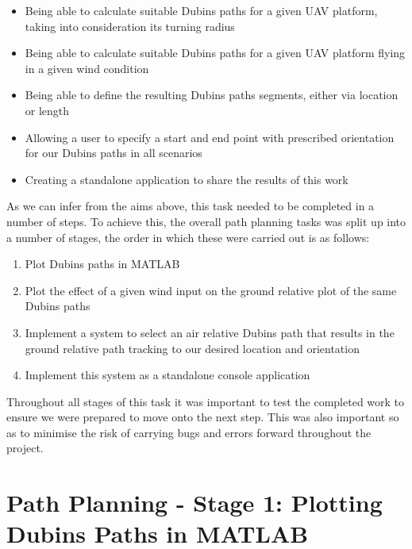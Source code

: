 \begin{itemize}
	\item Being able to calculate suitable Dubins paths for a given UAV platform, taking into consideration its turning radius
	\item Being able to calculate suitable Dubins paths for a given UAV platform flying in a given wind condition
	\item Being able to define the resulting Dubins paths segments, either via location or length
	\item Allowing a user to specify a start and end point with prescribed orientation for our Dubins paths in all scenarios
	\item Creating a standalone application to share the results of this work
\end{itemize}


As we can infer from the aims above, this task needed to be completed in a number of steps. To achieve this, the overall path planning tasks was split up into a number of stages, the order in which these were carried out is as follows:

\begin{enumerate}
	\item Plot Dubins paths in MATLAB
	\item Plot the effect of a given wind input on the ground relative plot of the same Dubins paths
	\item Implement a system to select an air relative Dubins path that results in the ground relative path tracking to our desired location and orientation
	\item Implement this system as a standalone console application
\end{enumerate}


Throughout all stages of this task it was important to test the completed work to ensure we were prepared to move onto the next step. This was also important so as to minimise the risk of carrying bugs and errors forward throughout the project. 

\section{Path Planning - Stage 1: Plotting Dubins Paths in MATLAB}
\label{task1:stage1}

